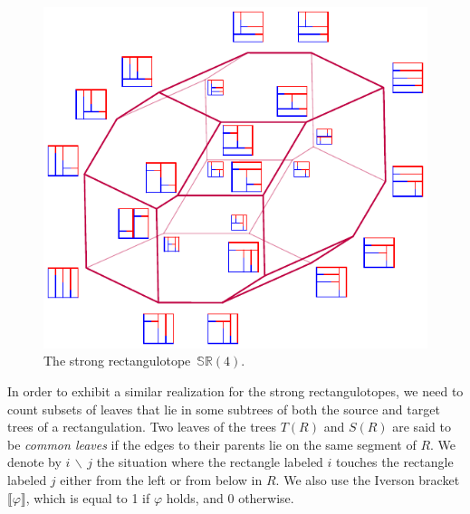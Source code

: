 \documentclass{amsart}
\theoremstyle{definition}
\newcommand{\darkblue}{\color{darkblue}} %
\newcommand{\defn}[1]{\textsl{\darkblue #1}} %
\newcommand{\polytope}[1]{\mathds{#1}} %
\newcommand{\SRP}{\polytope{SR}} %
\begin{document}
\begin{figure}
	\centerline{\includegraphics[scale=1.5]{strongRectangulotopeLabeled}}
	\caption{The strong rectangulotope~$\SRP(4)$.}
        \label{fig:strongRectangulotope}
\end{figure}

In order to exhibit a similar realization for the strong rectangulotopes, we need to count subsets of leaves that lie in some subtrees of both the source and target trees of a rectangulation.
Two leaves of the trees $T(R)$ and $S(R)$ are said to be \defn{common leaves} if the edges to their parents lie on the same segment of $R$.
We denote by $i \, \backslash \, j$ the situation where the rectangle labeled $i$ touches the rectangle labeled $j$ either from the left or from below in $R$.
We also use the Iverson bracket $\llbracket \varphi\rrbracket$, which is equal to 1 if $\varphi$ holds, and 0 otherwise.
\end{document}
